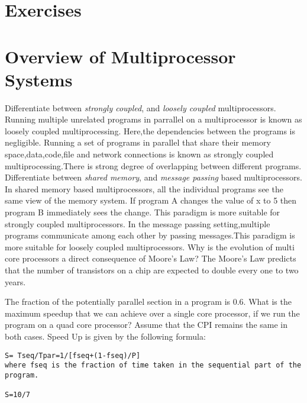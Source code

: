 \section*{Exercises}
\vskip 1cm

\setcounter{Exercise}{0}
\setcounter{Answer}{0}

\section*{Overview of Multiprocessor Systems}

\begin{ExerciseList}

\Exercise
Differentiate between {\em strongly coupled}, and {\em loosely coupled} multiprocessors. 
\Answer
Running multiple unrelated programs in parrallel on a multiprocessor is known as loosely coupled multiprocessing.
Here,the dependencies between the programs is negligible. 
Running a set of programs in parallel that share their memory space,data,code,file and network connections is known as strongly coupled multiprocessing.There is strong degree of overlapping between different programs. 
\Exercise
Differentiate between {\em shared memory}, and {\em message passing} based multiprocessors. 
\Answer
In shared memory based multiprocessors, all the individual programs see the same view of the memory system. If program A changes the value of x to 5 then program B immediately sees the change. This paradigm is more suitable for strongly coupled multiprocessors.
In the message passing setting,multiple programs communicate among each other by passing messages.This paradigm is more suitable for loosely coupled multiprocessors.
\Exercise
Why is the evolution of multi core processors a direct consequence of Moore's Law?
\Answer
The Moore's Law predicts that the number of transistors on a chip are expected to double every one to two years.

\Exercise
The fraction of the potentially parallel section in a program is 
0.6. What is the maximum speedup that we can achieve over a single core processor,
if we run the program on a quad core processor? Assume that the CPI remains the same
in both cases. 
\Answer
Speed Up is given by the following formula:
\begin{Verbatim}
S= Tseq/Tpar=1/[fseq+(1-fseq)/P]
where fseq is the fraction of time taken in the sequential part of the program.

S=10/7

\end{Verbatim}



\end{ExerciseList}
